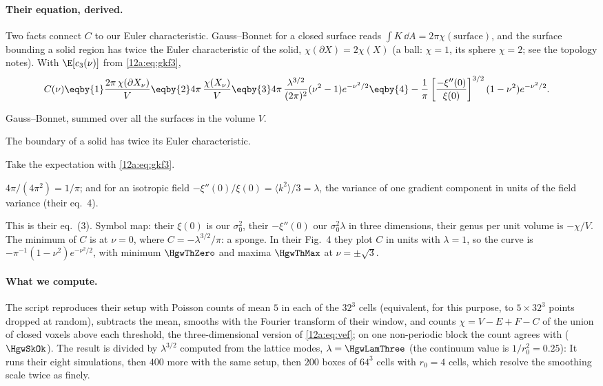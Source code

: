 \paragraph{Their equation, derived.} Two facts connect $C$ to our Euler characteristic. Gauss--Bonnet for a
closed surface reads $\int K\,\dd A=2\pi\chi(\text{surface})$, and the surface bounding a solid region has twice
the Euler characteristic of the solid, $\chi(\partial X)=2\chi(X)$ (a ball: $\chi=1$, its sphere $\chi=2$; see the
topology notes). With $\E[c_3(\nu)]$ from \eqref{12a:eq:gkf3},
\begin{align}
  C(\nu)
  &\eqby{1}\frac{2\pi\,\chi(\partial X_\nu)}{V}
   \eqby{2}4\pi\,\frac{\chi(X_\nu)}{V}
   \eqby{3}4\pi\,\frac{\lambda^{3/2}}{(2\pi)^2}(\nu^2-1)e^{-\nu^2/2}
   \eqby{4}-\frac1\pi\left[\frac{-\xi''(0)}{\xi(0)}\right]^{3/2}(1-\nu^2)e^{-\nu^2/2} .
  \label{12a:eq:hgw}
\end{align}
\begin{explain}
  \item Gauss--Bonnet, summed over all the surfaces in the volume $V$.
  \item The boundary of a solid has twice its Euler characteristic.
  \item Take the expectation with \eqref{12a:eq:gkf3}.
  \item $4\pi/(4\pi^2)=1/\pi$; and for an isotropic field $-\xi''(0)/\xi(0)=\langle k^2\rangle/3=\lambda$, the
        variance of one gradient component in units of the field variance (their eq.~4).
\end{explain}
This is their eq.~(3). Symbol map: their $\xi(0)$ is our $\sigma_0^2$, their $-\xi''(0)$ our $\sigma_0^2\lambda$
in three dimensions, their genus per unit volume is $-\chi/V$. The minimum of $C$ is at $\nu=0$, where
$C=-\lambda^{3/2}/\pi$: a sponge. In their Fig.~4 they plot $C$ in units with $\lambda=1$, so the curve is
$-\pi^{-1}(1-\nu^2)e^{-\nu^2/2}$, with minimum $\HgwThZero$ and maxima $\HgwThMax$ at $\nu=\pm\sqrt3$.

\paragraph{What we compute.} The script  reproduces their setup with Poisson
counts of mean $5$ in each of the $32^3$ cells (equivalent, for this purpose, to $5\times32^3$ points dropped at
random), subtracts the mean, smooths with the Fourier transform of their window, and counts
$\chi=V-E+F-C$ of the union of closed voxels above each threshold, the three-dimensional version of
\eqref{12a:eq:vef}; on one non-periodic block the count agrees with 
($\HgwSkOk$). The result is divided by $\lambda^{3/2}$ computed from the lattice modes, $\lambda=\HgwLamThree$
(the continuum value is $1/r_0^2=0.25$):
It runs their eight simulations, then $400$ more with the same setup, then $200$ boxes of $64^3$ cells with
$r_0=4$ cells, which resolve the smoothing scale twice as finely.

